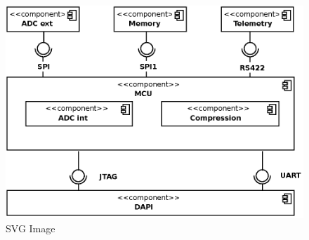\begin{figure}[htbp]
	\centering
	\includegraphics{Components.eps}
	\caption{SVG Image}
\end{figure}